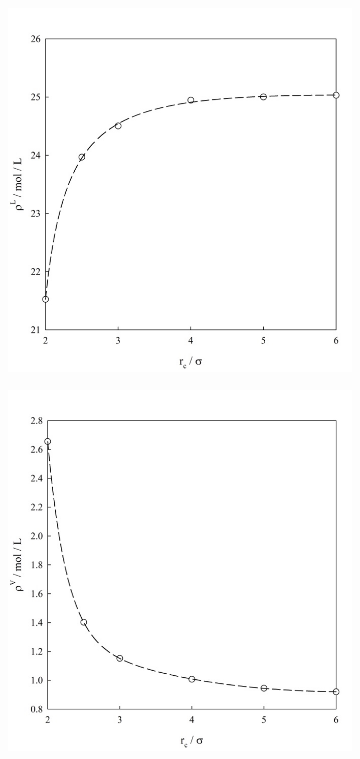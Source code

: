 \documentclass{scrbook}
\begin{document}
\begin{figure}
  \centering
  \begin{subfigure}{0.4\textwidth} %
    \includegraphics[width=1\textwidth]{gfx/image45.jpeg}
	\end{subfigure}
  \begin{subfigure}{0.4\textwidth} %
    \includegraphics[width=1\textwidth]{gfx/image46.jpeg}

\end{subfigure}
\end{figure}
\end{document}
